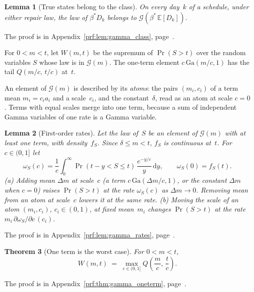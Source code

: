 \documentclass[11pt,a4paper]{article}
\theoremstyle{plain}
\newtheorem{theorem}{Theorem}[section]
\newtheorem{lemma}[theorem]{Lemma}
\theoremstyle{definition}
\theoremstyle{remark}
\begin{document}
\begin{lemma}[True states belong to the class]\label{lem:gamma_class}
On every day~$k$ of a schedule, under either repair law, the law of $\beta^* D_k$ belongs to $\mathcal{G}(\beta^*\,\mathbb{E}[D_k])$.
\end{lemma}
The proof is in Appendix~\ref{prf:lem:gamma_class}, page~\pageref{prf:lem:gamma_class}.

For $0 < m < t$, let $W(m, t)$ be the supremum of $\Pr(S > t)$ over the random variables $S$ whose law is in $\mathcal{G}(m)$.
The one-term element $c\,\mathrm{Ga}(m/c, 1)$ has the tail $Q(m/c,\, t/c)$ at~$t$.

An element of $\mathcal{G}(m)$ is described by its \emph{atoms}: the pairs $(m_i, c_i)$ of a term mean $m_i = c_i a_i$ and a scale~$c_i$, and the constant~$\delta$, read as an atom at scale $c = 0$.
Terms with equal scales merge into one term, because a sum of independent Gamma variables of one rate is a Gamma variable.

\begin{lemma}[First-order rates]\label{lem:gamma_rates}
Let the law of~$S$ be an element of $\mathcal{G}(m)$ with at least one term, with density~$f_S$.
Since $\delta \le m < t$, $f_S$ is continuous at~$t$.
For $c \in (0, 1]$ let
\begin{equation}
  \omega_S(c) = \frac{1}{c}\int_0^\infty \Pr(t - y < S \le t)\,\frac{e^{-y/c}}{y}\, \mathrm{d}y,
  \qquad \omega_S(0) = f_S(t).
\end{equation}
(a) Adding mean $\Delta m$ at scale~$c$ (a term $c\,\mathrm{Ga}(\Delta m/c, 1)$, or the constant $\Delta m$ when $c = 0$) raises $\Pr(S > t)$ at the rate $\omega_S(c)$ as $\Delta m \to 0$.
Removing mean from an atom at scale~$c$ lowers it at the same rate.
(b) Moving the scale of an atom $(m_i, c_i)$, $c_i \in (0,1)$, at fixed mean~$m_i$ changes $\Pr(S > t)$ at the rate $m_i\, \partial\omega_S/\partial c\,(c_i)$.
\end{lemma}
The proof is in Appendix~\ref{prf:lem:gamma_rates}, page~\pageref{prf:lem:gamma_rates}.

\begin{theorem}[One term is the worst case]\label{thm:gamma_oneterm}
For $0 < m < t$,
\begin{equation}
  W(m, t) \;=\; \max_{c \in (0,1]} Q\!\left(\frac{m}{c},\, \frac{t}{c}\right).
\end{equation}
\end{theorem}
The proof is in Appendix~\ref{prf:thm:gamma_oneterm}, page~\pageref{prf:thm:gamma_oneterm}.
\end{document}
